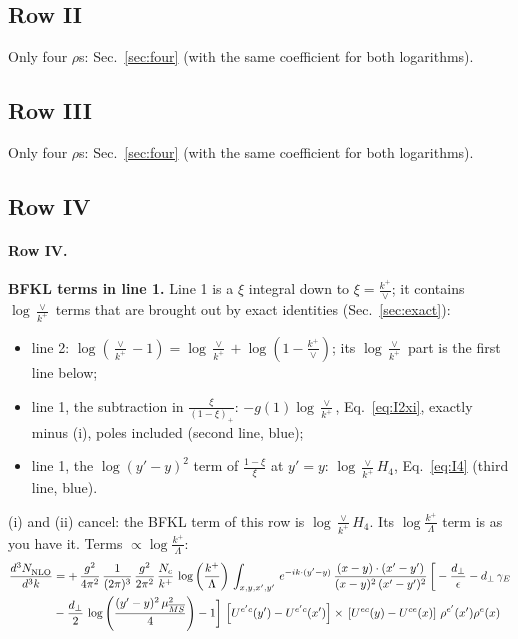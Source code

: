 \documentclass[10pt]{article}
\numberwithin{equation}{section}
\newcommand{\new}[1]{{\color{blue}#1}}
\begin{document}
\subsection{Row II}
Only four $\rho$\textquotesingle s: Sec.~\ref{sec:four} (with the same coefficient for both logarithms).
\subsection{Row III}
Only four $\rho$\textquotesingle s: Sec.~\ref{sec:four} (with the same coefficient for both logarithms).
\subsection{Row IV}
\paragraph{Row IV.}
\textbf{BFKL terms in line 1.} Line 1 is a $\xi$ integral down to $\xi=\frac{k^+}{\vee}$; it contains $\log\frac{\vee}{k^+}$ terms that are brought out by exact identities (Sec.~\ref{sec:exact}):
\begin{itemize}
\item[(i)] line 2: $\log(\frac{\vee}{k^+}-1)=\log\frac{\vee}{k^+}+\log(1-\frac{k^+}{\vee})$; its $\log\frac{\vee}{k^+}$ part is the first line below;
\item[(ii)] line 1, the subtraction in $\frac{\xi}{(1-\xi)_+}$: $-g(1)\log\frac{\vee}{k^+}$, Eq.~\eqref{eq:I2xi}, exactly minus (i), poles included (second line, \new{blue});
\item[(iii)] line 1, the $\log(y'-y)^2$ term of $\frac{1-\xi}{\xi}$ at $y'=y$: $\log\frac{\vee}{k^+}H_4$, Eq.~\eqref{eq:I4} (third line, \new{blue}).
\end{itemize}
(i) and (ii) cancel: the BFKL term of this row is $\log\frac{\vee}{k^+}H_4$. Its $\log\frac{k^+}{\Lambda}$ term is as you have it.
\noindent Terms $\propto\log\frac{k^+}{\Lambda}$:
\begin{align}
    \frac{d^{3}N_{\rm NLO}^{\rm}}{d^{3}k}  & =    +\, \frac{g^{2}}{4\pi^{2}}\, \frac{1}{(2\pi)^{3}}\,\frac{g^{2}}{2\pi^{2}}\, \frac{N_{c}}{k^{+}}\,\log{\left(\frac{k^{+}}{\Lambda}\right)}\,\int_{x,y,x',y'}\,e^{-ik\cdot (y'-y)}\,\frac{(x-y)\cdot (x'-y')}{(x-y)^{2}\,(x'-y')^{2}}\,\bigg[-\frac{d_{\perp}}{\epsilon}-d_{\perp}\,\gamma_{E}\notag \\ & -\frac{d_{\perp}}{2}\,\log{\left(\frac{(y'-y)^{2}\,\mu^{2}_{\overline{MS}}}{4}\right)}-1\bigg]\,\left[U^{e'c}(y') - U^{e'c}(x')\right] \times\, \left[U^{ec}(y) - U^{ce}(x)\right]\, \rho^{e'}(x') \rho^{e}(x) \label{eq:J:G2IV}
\end{align}
\end{document}
